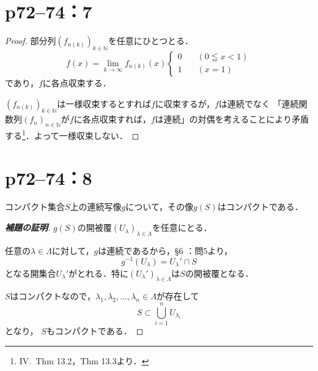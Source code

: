 \documentclass[a4paper,10pt,fleqn]{ltjsarticle}
\begin{document}
\section*{p72--74：7}

\begin{tleftbar}
    \begin{proof}
        部分列$(f_{n(k)})_{k \in \mathbb{N}}$を任意にひとつとる．
        \[
            f(x)= \lim_{k \to \infty} f_{n(k)}(x)
            \begin{cases}
                0 \quad  & ( 0 \leqq x < 1) \\
                1  \quad & ( x=1)
            \end{cases}
        \]
        であり，$f$に各点収束する．

        $(f_{n(k)})_{k \in \mathbb{N}}$は一様収束するとすれば$f$に収束するが，$f$は連続でなく
        「連続関数列$(f_n)_{n \in \mathbb{N}}$が$f$に各点収束すれば，$f$は連続」の対偶を考えることにより矛盾する\footnote{IV.~Thm 13.2，Thm 13.3より．}．よって一様収束しない．
    \end{proof}
\end{tleftbar}

\newpage


\section*{p72--74：8}



コンパクト集合$S$上の連続写像$g$について，その像$g(S)$はコンパクトである．

\begin{proof}[\textup{\textbf{補題の証明}}]
    $g(S)$の開被覆$(U_{\lambda})_{\lambda \in \Lambda}$を任意にとる．

    任意の$\lambda \in \Lambda$に対して，$g$は連続であるから，\S 6 ：問5より，
    \[
        g^{-1}(U_{\lambda}) =  U_{\lambda}'  \cap S
    \]
    となる開集合$U_{\lambda}'$がとれる．特に$(U_{\lambda}')_{\lambda \in \Lambda}$は$S$の開被覆となる．

    $S$はコンパクトなので，$\lambda_1, \lambda_2, \ldots , \lambda_n \in \Lambda$が存在して
    \[
        S \subset \bigcup_{i=1}^{n} U_{\lambda_i}
    \]
    となり， $S$もコンパクトである．
\end{proof}
\end{document}

